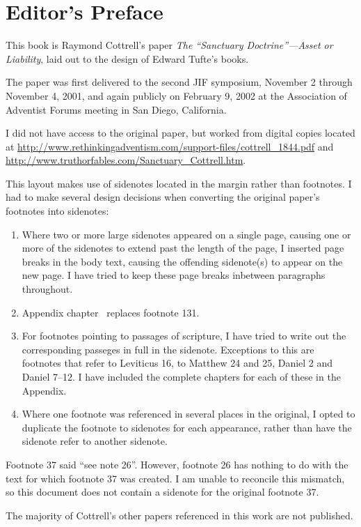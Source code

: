\chapter{Editor's Preface}
\label{ch:editor}

This book is Raymond Cottrell's paper \textit{The ``Sanctuary Doctrine''---Asset 
or Liability}, laid out to the design of Edward Tufte's books.  

The paper was first delivered to the second JIF symposium, November 2 through 
November 4, 2001, and again publicly on February 9, 2002 at the Association of 
Adventist Forums meeting in San Diego, California.

I did not have access to the original paper, but worked from digital copies
located at \url{http://www.rethinkingadventism.com/support-files/cottrell_1844.pdf}
and \url{http://www.truthorfables.com/Sanctuary_Cottrell.htm}.

This layout makes use of sidenotes located in the margin rather than footnotes.
I had to make several design decisions when converting the original paper's 
footnotes into sidenotes:
\begin{enumerate}
    \item Where two or more large sidenotes appeared on a single page, causing one
    or more of the sidenotes to extend past the length of the page, I inserted page
    breaks in the body text, causing the offending sidenote(s) to appear on the
    new page.  I have tried to keep these page breaks inbetween paragraphs 
    throughout.
    \item Appendix chapter~ replaces footnote 131.
    \item For footnotes pointing to passages of scripture, I have tried to
    write out the corresponding passeges in full in the sidenote.  Exceptions
    to this are footnotes that refer to Leviticus 16, to Matthew 24 and 25,
    Daniel 2 and Daniel 7--12. I have included the complete chapters for each
    of these in the Appendix.
    \item Where one footnote was referenced in several places in the original,
    I opted to duplicate the footnote to sidenotes for each appearance, rather
    than have the sidenote refer to another sidenote.
\end{enumerate}

Footnote 37 said ``see note 26''. However, footnote 26 has nothing to do with 
the text for which footnote 37 was created.  I am unable to reconcile this
mismatch, so this document does not contain a sidenote for the original
footnote 37.



The majority of Cottrell's other papers referenced in this work are not
published.
